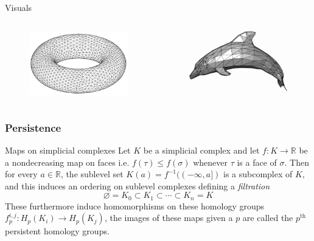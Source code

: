 \documentclass{beamer}
\theoremstyle{definition}
\numberwithin{theorem}{section}
\begin{document}
\begin{frame}{Visuals}
\vspace{0.1cm}
\begin{columns}

	\begin{column}{0.3\textwidth}
		\begin{figure}
		\includegraphics[width = 5cm]{Torus-triang.png}
		\tiny
	\end{figure}
	\end{column}
	\begin{column}{0.6\textwidth}
		\begin{figure}
		\includegraphics[width = 5cm]{Dolphin_triangle_mesh.png}
		\tiny
		\end{figure}

	\end{column}
\end{columns}
\end{frame}


\begin{frame}
\frametitle{Persistence}
\begin{block}{Maps on simplicial complexes}
Let $K$ be a simplicial complex and let $f:K\rightarrow\mathbb{R}$ be a nondecreasing map on faces i.e. $f(\tau)\leq f(\sigma)$ whenever $\tau$ is a face of $\sigma$. Then for every $a\in\mathbb{R}$, the sublevel set $K(a) = f^{-1}((-\infty,a])$ is a subcomplex of $K$, and this induces an ordering on sublevel complexes defining a \textit{filtration} $$\varnothing = K_0 \subset K_1 \subset \cdots \subset K_n = K$$ These furthermore induce homomorphisms on these homology groups $f^{i,j}_p: H_p(K_i)\rightarrow H_p(K_j)$, the images of these maps given a $p$ are called the $p^{\textrm{th}}$ persistent homology groups.
\end{block}
\end{frame}
\end{document}
